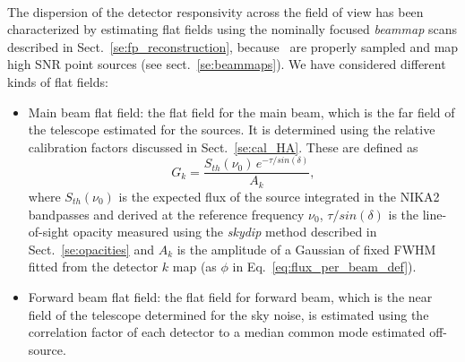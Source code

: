 

\label{se:flatfields}

\\

The dispersion of the detector responsivity across the field of view has been
characterized by estimating flat fields using the nominally focused
\emph{beammap} scans described in Sect.~\ref{se:fp_reconstruction}, because
\bms\ are properly sampled and map high SNR point sources (see sect.~\ref{se:beammaps}). We have
considered different kinds of flat fields:
\begin{itemize}
\item Main beam flat field: the flat field for the main beam, which is the far
  field of the telescope estimated for the sources. It is determined using the
  relative calibration factors 
  discussed in Sect.~\ref{se:cal_HA}. These are defined as
  \begin{equation}
    G_k = \frac{S_{th}(\nu_0)\, e^{-\tau/sin(\delta)}}{A_k}, 
  \end{equation}
  where $S_{th}(\nu_0)$ is the expected flux of the source integrated in the
  NIKA2 bandpasses and derived at the reference frequency $\nu_0$,
  $\tau/sin(\delta)$ is the line-of-sight opacity measured using the
  \emph{skydip} method described in Sect.~\ref{se:opacities} and $A_k$ is the
  amplitude of a Gaussian of fixed FWHM fitted from the detector $k$ map (as
  $\phi$ in Eq.~\ref{eq:flux_per_beam_def}).
\item Forward beam flat field: the flat field for forward beam, which is the near field of the telescope determined for the sky noise, is estimated using the correlation factor of each detector to a median common mode estimated off-source.
\end{itemize}

